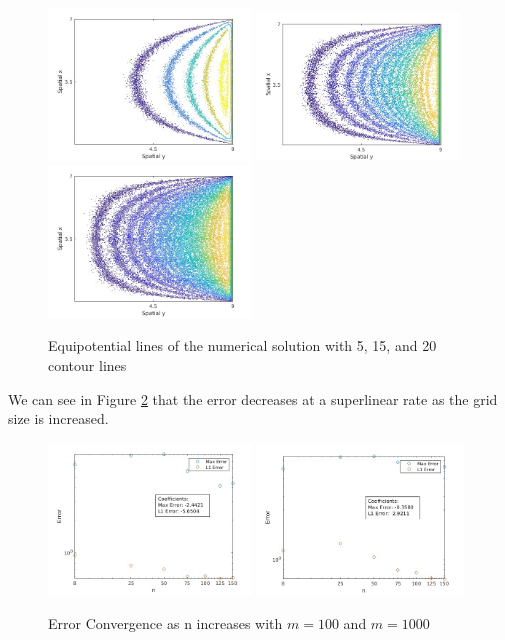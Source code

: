 \documentclass{amsart}
\begin{document}
\begin{figure}[h]
	\caption{Equipotential lines of the numerical solution with 5, 15, and 20 contour lines}
	\label{EP5}
	\includegraphics[width=0.48\textwidth]{EP5.jpg}
	\includegraphics[width=0.48\textwidth]{EP15.jpg}
	\includegraphics[width=0.48\textwidth]{EP20.jpg}
\end{figure}

We can see in Figure \ref{gridsizeconv} that the error decreases at a superlinear rate as the grid size is increased.

\begin{figure}[H]
	\caption{Error Convergence as n increases with $m=100$ and $m=1000$}
	\label{gridsizeconv}
	\includegraphics[width=0.48\textwidth]{error_plot_m=100.jpg}
	\includegraphics[width=0.49\textwidth]{error_plot_m=1000.jpg}
\end{figure}
\end{document}
